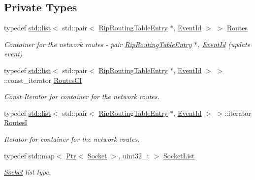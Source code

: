\subsection*{Private Types}
\begin{DoxyCompactItemize}
\item 
typedef \hyperlink{openflow-interface_8h_afd9bcfa176617760671b67580f536fa7}{std\+::list}$<$ std\+::pair$<$ \hyperlink{classns3_1_1RipRoutingTableEntry}{Rip\+Routing\+Table\+Entry} $\ast$, \hyperlink{classns3_1_1EventId}{Event\+Id} $>$ $>$ \hyperlink{classns3_1_1Rip_a7108837a80349ce23ac60d043ac81d58}{Routes}
\begin{DoxyCompactList}\small\item\em Container for the network routes -\/ pair \hyperlink{classns3_1_1RipRoutingTableEntry}{Rip\+Routing\+Table\+Entry} $\ast$, \hyperlink{classns3_1_1EventId}{Event\+Id} (update event) \end{DoxyCompactList}\item 
typedef \hyperlink{openflow-interface_8h_afd9bcfa176617760671b67580f536fa7}{std\+::list}$<$ std\+::pair$<$ \hyperlink{classns3_1_1RipRoutingTableEntry}{Rip\+Routing\+Table\+Entry} $\ast$, \hyperlink{classns3_1_1EventId}{Event\+Id} $>$ $>$\+::const\+\_\+iterator \hyperlink{classns3_1_1Rip_a20080eb47fbc0ac67e3eba1c61cbafcb}{Routes\+CI}
\begin{DoxyCompactList}\small\item\em Const Iterator for container for the network routes. \end{DoxyCompactList}\item 
typedef \hyperlink{openflow-interface_8h_afd9bcfa176617760671b67580f536fa7}{std\+::list}$<$ std\+::pair$<$ \hyperlink{classns3_1_1RipRoutingTableEntry}{Rip\+Routing\+Table\+Entry} $\ast$, \hyperlink{classns3_1_1EventId}{Event\+Id} $>$ $>$\+::iterator \hyperlink{classns3_1_1Rip_a8819af4dd44f270b6b19be755b39bce8}{RoutesI}
\begin{DoxyCompactList}\small\item\em Iterator for container for the network routes. \end{DoxyCompactList}\item 
typedef std\+::map$<$ \hyperlink{classns3_1_1Ptr}{Ptr}$<$ \hyperlink{classns3_1_1Socket}{Socket} $>$, uint32\+\_\+t $>$ \hyperlink{classns3_1_1Rip_afc81050735dfff6d48facd8284f0954f}{Socket\+List}
\begin{DoxyCompactList}\small\item\em \hyperlink{classns3_1_1Socket}{Socket} list type. \end{DoxyCompactList}\item 

\end{DoxyCompactItemize}
